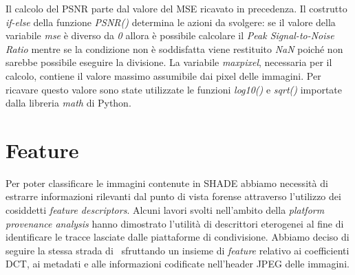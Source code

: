 Il calcolo del PSNR parte dal valore del MSE ricavato in precedenza. Il costrutto \textit{if-else} della funzione \textit{PSNR()} determina le azioni da svolgere: se il valore della variabile \textit{mse} è diverso da \textit{0} allora è possibile calcolare il \textit{Peak Signal-to-Noise Ratio} mentre se la condizione non è soddisfatta viene restituito \textit{NaN} poiché non sarebbe possibile eseguire la divisione. La variabile \textit{max\textunderscore pixel}, necessaria per il calcolo, contiene il valore massimo assumibile dai pixel delle immagini. Per ricavare questo valore sono state utilizzate le funzioni \textit{log10()} e \textit{sqrt()} importate dalla libreria \textit{math} di Python.

\section{Feature}
\label{sec:estr_feat}

Per poter classificare le immagini contenute in SHADE abbiamo necessità di estrarre informazioni rilevanti dal punto di vista forense attraverso l'utilizzo dei cosiddetti \textit{feature descriptors}. Alcuni lavori svolti nell'ambito della \textit{platform provenance analysis} hanno dimostrato l'utilità di descrittori eterogenei al fine di identificare le tracce lasciate dalle piattaforme di condivisione. Abbiamo deciso di seguire la stessa strada di~\cite{verde2021multi} sfruttando un insieme di \textit{feature} relativo ai coefficienti DCT, ai metadati e alle informazioni codificate nell'header JPEG delle immagini.

